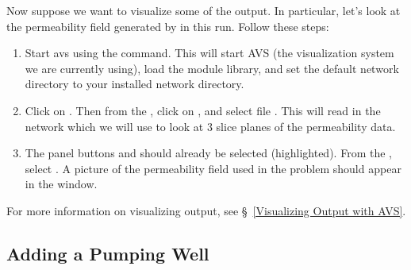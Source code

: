 Now suppose we want to visualize some of the output.
In particular, let's look at the permeability field generated
by \parflow{} in this run.
Follow these steps:
\begin{enumerate}

\item
Start avs using the  command.
This will start AVS (the visualization system we are currently
using), load the \parflow{} module library, and set the default
network directory to your installed \parflow{} network directory.

\item
Click on .
Then from the , click on ,
and select file .
This will read in the  network which we will
use to look at 3 slice planes of the permeability data.

\item
The panel buttons  and 
should already be selected (highlighted).
From the , select .
A picture of the permeability field used in the problem should
appear in the  window.

\end{enumerate}
For more information on visualizing \parflow{} output,
see \S~\ref{Visualizing Output with AVS}.

\subsection*{Adding a Pumping Well}

